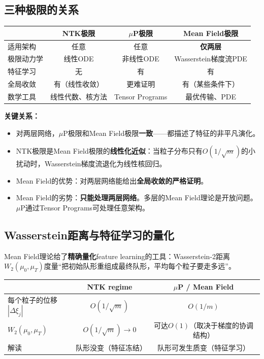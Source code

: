 \documentclass[11pt,a4paper]{article}
\begin{document}
\subsection{三种极限的关系}

\begin{center}
\renewcommand{\arraystretch}{1.4}
\begin{tabular}{l|ccc}
\toprule
& \textbf{NTK极限} & \textbf{$\mu$P极限} & \textbf{Mean Field极限} \\
\midrule
适用架构 & 任意 & 任意 & \textbf{仅两层} \\
极限动力学 & 线性ODE & 非线性ODE & Wasserstein梯度流PDE \\
特征学习 & 无 & 有 & 有 \\
全局收敛 & 有（线性收敛） & 更难证明 & 有（某些条件下） \\
数学工具 & 线性代数、核方法 & Tensor Programs & 最优传输、PDE \\
\bottomrule
\end{tabular}
\end{center}

\textbf{关键关系：}
\begin{itemize}[leftmargin=*]
\item 对两层网络，$\mu$P极限和Mean Field极限\textbf{一致}——都描述了特征的非平凡演化。
\item NTK极限是Mean Field极限的\textbf{线性化近似}：当粒子分布只有$O(1/\sqrt{m})$的小扰动时，Wasserstein梯度流退化为线性核回归。
\item Mean Field的优势：对两层网络能给出\textbf{全局收敛的严格证明}。
\item Mean Field的劣势：\textbf{只能处理两层网络}。多层的Mean Field理论是开放问题。$\mu$P通过Tensor Programs可处理任意架构。
\end{itemize}

\subsection{Wasserstein距离与特征学习的量化}

Mean Field理论给了\textbf{精确量化}feature learning的工具：Wasserstein-2距离$W_2(\mu_0,\mu_T)$度量``把初始队形重组成最终队形，平均每个粒子要走多远''。

\begin{center}
\renewcommand{\arraystretch}{1.3}
\begin{tabular}{l|cc}
\toprule
& NTK regime & $\mu$P / Mean Field \\
\midrule
每个粒子的位移$|\Delta\xi_j|$ & $O(1/\sqrt{m})$ & $O(1/m)$ \\
$W_2(\mu_0,\mu_T)$ & $O(1/\sqrt{m})\to 0$ & 可达$O(1)$（取决于梯度的协调结构） \\
解读 & 队形没变（特征冻结） & 队形可发生质变（特征学习） \\
\bottomrule
\end{tabular}
\end{center}
\end{document}
